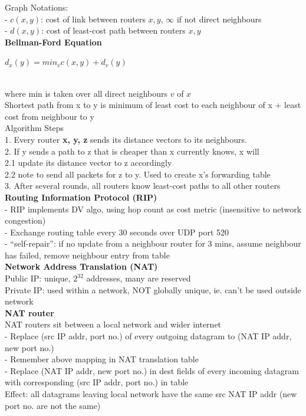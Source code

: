 \documentclass[10pt, a4paper]{article}
\newcommand{\blue}[1]{{\color{MidnightBlue}#1}}
\newcommand{\red}[1]{{\color{red}#1}}
\newcommand{\green}[1]{{\color{ForestGreen}#1}}
\newcommand{\tab}[0]{\hspace*{2mm}}
\begin{document}
\begin{multicols*}{3}
		Graph Notations:\\
		- $c(x, y)$: cost of link between routers $x, y$, $\infty$ if not direct neighbours\\
		- $d(x, y)$: cost of least-cost path between routers $x, y$\\

		\textbf{Bellman-Ford Equation}\\
		\centerline{$d_{x}(y) = min_{v}{c(x, y) + d_{v}(y)}$}\\
		where min is taken over all direct neighbours $v$ of $x$\\
		Shortest path from x to y is minimum of least cost to each neighbour of x + least cost from neighbour to y\\

		Algorithm Steps\\
		1. Every router \textbf{x, y, z} sends its distance vectors to its neighbours.\\
		2. If y sends a path to z that is cheaper than x currently knows, x will\\
		\tab 2.1 \blue{update its distance vector to z} accordingly\\
		\tab 2.2 note to \blue{send all packets for z to y}. Used to create x's forwarding table\\
		3. After several rounds, all routers know least-cost paths to all other routers\\

		\textbf{Routing Information Protocol (RIP)}\\
		- RIP implements DV algo, using \blue{hop count} as cost metric (insensitive to network congestion)\\
		- Exchange routing table every 30 seconds over \blue{UDP port 520}\\
		- ``self-repair'': if no update from a neighbour router for 3 mins, assume neighbour has failed, remove neighbour entry from table\\

		\textbf{Network Address Translation (NAT)}\\
		Public IP: unique, $2^{32}$ addresses, many are reserved\\
		Private IP: used within a network, \red{NOT} globally unique, ie. can't be used outside network\\

		\textbf{NAT router}\\
		NAT routers sit between a local network and wider internet\\
		- \blue{Replace} (src IP addr, port no.) of \red{every outgoing datagram} to (NAT IP addr, new port no.)\\
		- \blue{Remember} above mapping in NAT translation table\\
		- \blue{Replace} (NAT IP addr, new port no.) in dest fields of every \blue{incoming datagram} with corresponding (src IP addr, port no.) in table\\
		\green{Effect:} \red{all} datagrams \red{leaving} local network have the same src NAT IP addr (new port no. are not the same)\\


\end{multicols*}
\end{document}
